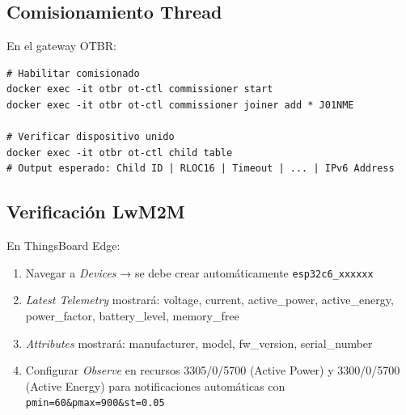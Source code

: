 \subsection{Comisionamiento Thread}

En el gateway OTBR:

\begin{verbatim}
# Habilitar comisionado
docker exec -it otbr ot-ctl commissioner start
docker exec -it otbr ot-ctl commissioner joiner add * J01NME

# Verificar dispositivo unido
docker exec -it otbr ot-ctl child table
# Output esperado: Child ID | RLOC16 | Timeout | ... | IPv6 Address
\end{verbatim}

\subsection{Verificación LwM2M}

En ThingsBoard Edge:

\begin{enumerate}
    \item Navegar a \textit{Devices} → se debe crear automáticamente \texttt{esp32c6\_xxxxxx}
    \item \textit{Latest Telemetry} mostrará: voltage, current, active\_power, active\_energy, power\_factor, battery\_level, memory\_free
    \item \textit{Attributes} mostrará: manufacturer, model, fw\_version, serial\_number
    \item Configurar \textit{Observe} en recursos 3305/0/5700 (Active Power) y 3300/0/5700 (Active Energy) para notificaciones automáticas con \texttt{pmin=60\&pmax=900\&st=0.05}
\end{enumerate}

